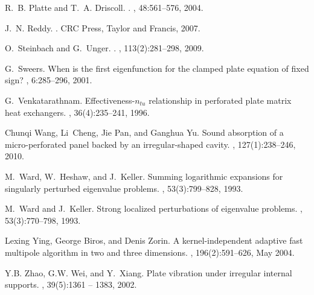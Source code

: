 \documentclass[times]{article}
\begin{document}
\begin{thebibliography}{10}
R.~B. Platte and T.~A. Driscoll.
.
, 48:561--576, 2004.

J.~N. Reddy.
.
\newblock CRC Press, Taylor and Francis, 2007.

O.~Steinbach and G.~Unger.
.
, 113(2):281--298, 2009.

G.~Sweers.
\newblock When is the first eigenfunction for the clamped plate equation of
  fixed sign?
, 6:285--296, 2001.

G.~Venkatarathnam.
\newblock Effectiveness-$n_{tu}$ relationship in perforated plate matrix heat
  exchangers.
, 36(4):235--241, 1996.

Chunqi Wang, Li~Cheng, Jie Pan, and Ganghua Yu.
\newblock Sound absorption of a micro-perforated panel backed by an
  irregular-shaped cavity.
,
  127(1):238--246, 2010.

M.~Ward, W.~Heshaw, and J.~Keller.
\newblock Summing logarithmic expansions for singularly perturbed eigenvalue
  problems.
, 53(3):799--828, 1993.

M.~Ward and J.~Keller.
\newblock Strong localized perturbations of eigenvalue problems.
, 53(3):770--798, 1993.

Lexing Ying, George Biros, and Denis Zorin.
\newblock A kernel-independent adaptive fast multipole algorithm in two and
  three dimensions.
, 196(2):591--626, May 2004.

Y.B. Zhao, G.W. Wei, and Y.~Xiang.
\newblock Plate vibration under irregular internal supports.
, 39(5):1361 --
  1383, 2002.

\end{thebibliography}
\end{document}
